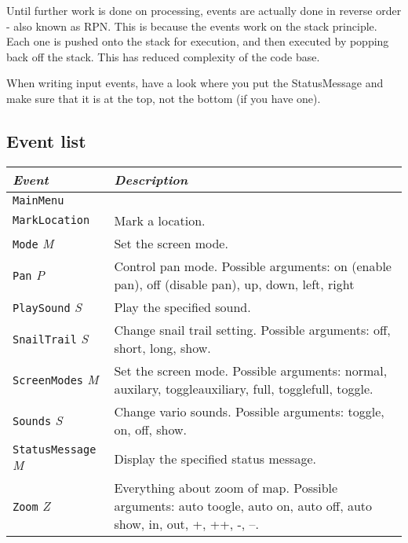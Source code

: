 Until further work is done on processing, events are actually done in
reverse order - also known as RPN. This is because the events work on
the stack principle. Each one is pushed onto the stack for execution,
and then executed by popping back off the stack. This has reduced
complexity of the code base.

When writing input events, have a look where you put the StatusMessage
and make sure that it is at the top, not the bottom (if you have one).

\subsection{Event list}

{\footnotesize
\begin{tabular}{l|p{7cm}}
\emph{Event} & \emph{Description} \\

\hline

\texttt{MainMenu} & \\

\hline

\texttt{MarkLocation} & Mark a location. \\

\hline

\texttt{Mode} \emph{M} & Set the screen mode. \\

\hline

\texttt{Pan} \emph{P} & Control pan mode.  Possible arguments: on
(enable pan), off (disable pan), up, down, left, right \\

\hline

\texttt{PlaySound} \emph{S} & Play the specified sound. \\

\hline

\texttt{SnailTrail} \emph{S} & Change snail trail setting.  Possible
arguments: off, short, long, show. \\

\hline

\texttt{ScreenModes} \emph{M} & Set the screen mode.  Possible
arguments: normal, auxilary, toggleauxiliary, full, togglefull,
toggle. \\

\hline

\texttt{Sounds} \emph{S} & Change vario sounds.  Possible arguments:
toggle, on, off, show. \\

\hline

\texttt{StatusMessage} \emph{M} & Display the specified status
message. \\

\hline

\texttt{Zoom} \emph{Z} & Everything about zoom of map.  Possible
arguments: auto toogle, auto on, auto off, auto show, in, out, +, ++,
-, --. \\

\end{tabular}}

